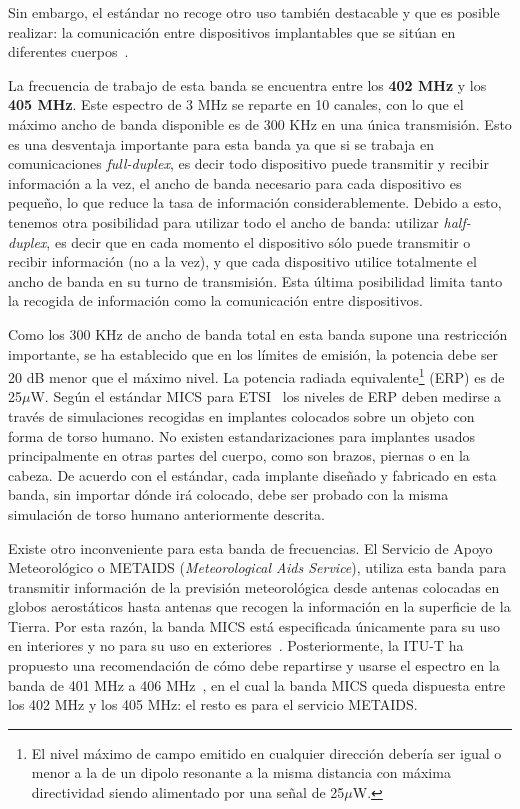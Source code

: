 Sin embargo, el estándar no recoge otro uso también destacable y que es posible realizar: la comunicación entre dispositivos implantables que se sitúan en diferentes cuerpos~\cite{yang9}.

La frecuencia de trabajo de esta banda se encuentra entre los \textbf{402 MHz} y los \textbf{405 MHz}. Este espectro de 3 MHz se reparte en 10 canales, con lo que el máximo ancho de banda disponible es de 300 KHz en una única transmisión. Esto es una desventaja importante para esta banda ya que si se trabaja en comunicaciones \textit{full-duplex}, es decir todo dispositivo puede transmitir y recibir información a la vez, el ancho de banda necesario para cada dispositivo es pequeño, lo que reduce la tasa de información considerablemente. Debido a esto, tenemos otra posibilidad para utilizar todo el ancho de banda: utilizar \textit{half-duplex}, es decir que en cada momento el dispositivo sólo puede transmitir o recibir información (no a la vez), y que cada dispositivo utilice totalmente el ancho de banda en su turno de transmisión. Esta última posibilidad limita tanto la recogida de información como la comunicación entre dispositivos.

Como los 300 KHz de ancho de banda total en esta banda supone una restricción importante, se ha establecido que en los límites de emisión, la potencia debe ser 20 dB menor que el máximo nivel. La potencia radiada equivalente\footnote{El nivel máximo de campo emitido en cualquier dirección debería ser igual o menor a la de un dipolo resonante a la misma distancia con máxima directividad siendo alimentado por una señal de 25$\mu$W.} (ERP) es de 25$\mu$W. Según el estándar MICS para ETSI~\cite{mics} los niveles de ERP deben medirse a través de simulaciones recogidas en implantes colocados sobre un objeto con forma de torso humano. No existen estandarizaciones para implantes usados principalmente en otras partes del cuerpo, como son brazos, piernas o en la cabeza. De acuerdo con el estándar, cada implante diseñado y fabricado en esta banda, sin importar dónde irá colocado, debe ser probado con la misma simulación de torso humano anteriormente descrita.

Existe otro inconveniente para esta banda de frecuencias. El Servicio de Apoyo Meteorológico o METAIDS (\textit{Meteorological Aids Service}), utiliza esta banda para transmitir información de la previsión meteorológica desde antenas colocadas en globos aerostáticos hasta antenas que recogen la información en la superficie de la Tierra. Por esta razón, la banda MICS está especificada únicamente para su uso en interiores y no para su uso en exteriores~\cite{yang9,mics}. Posteriormente, la ITU-T ha propuesto una recomendación de cómo debe repartirse y usarse el espectro en la banda de 401 MHz a 406 MHz~\cite{itut}, en el cual la banda MICS queda dispuesta entre los 402 MHz y los 405 MHz: el resto es para el servicio METAIDS.

